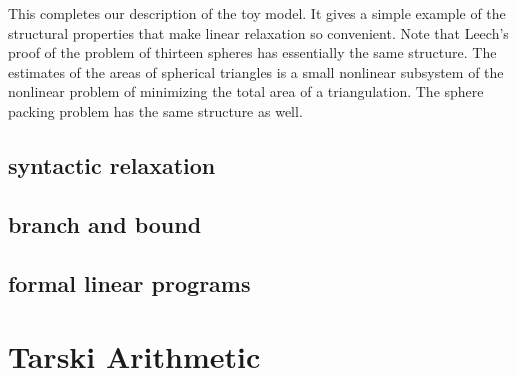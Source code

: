 This completes our description of the toy model.  It gives a simple example of the
structural properties that make linear relaxation so convenient.
Note that Leech's proof of the problem of thirteen spheres has essentially the same
structure.  The estimates of the areas of spherical triangles is a small nonlinear subsystem
of the nonlinear problem of minimizing the total area of a triangulation.
The sphere packing problem has the same structure as well.



\subsection{syntactic relaxation}





\subsection{branch and bound}

\subsection{formal linear programs}




\clearpage




\section{Tarski Arithmetic}


\clearpage
